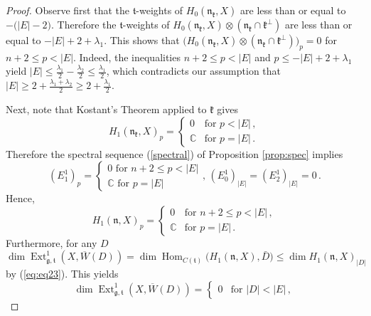 \documentclass{tglat2e}
\theoremstyle{definition}
\theoremstyle{remark}
\renewcommand{\tt}{\mathfrak{t}}
\newcommand{\kk}{\mathfrak{k}}
\newcommand{\nn}{\mathfrak{n}}
\renewcommand{\gg}{\mathfrak{g}}
\DeclareMathOperator{\Hom}{Hom}
\DeclareMathOperator{\Ext}{Ext}
\begin{document}
	\begin{proof}
		Observe first that the $\tt$-weights of $H_0\left(\nn_\kk,X\right)$ are less than or equal to $-\big(|E|-2\big)$.  Therefore the $\tt$-weights of $H_0\left(\nn_\kk,X\right)\otimes \left(\nn_\kk\cap \kk^\perp\right)$ are less than or equal to $-|E|+2+\lambda_1$.  This shows that $\Big(H_0\left(\nn_\kk,X\right)\otimes\left(\nn_\kk\cap\kk^\perp\right)\Big)_p=0$ for $n+2\leq p <|E|$.   Indeed, the inequalities $n+2\leq p<|E|$ and $p\leq -|E|+2+\lambda_1$ yield $|E|\leq \frac{\lambda_1}{2}-\frac{\lambda_2}{2}\leq \frac{\lambda_1}{2}$, which contradicts our assumption that $|E|\geq 2+\frac{\lambda_1+\lambda_2}{2}\geq 2+\frac{\lambda_1}{2}$.
		
		Next, note that Kostant's Theorem applied to $\kk$ gives
		\begin{equation*}
			H_1\left(\nn_\kk,X\right)_p=\left\{
				\begin{array}{ll}
					0	&	\text{for }p<|E|\,,
					\\
					\mathbb{C}	&	\text{for }p=|E|\,.
				\end{array}
			\right.
		\end{equation*}
		Therefore the spectral sequence (\ref{spectral}) of Proposition \ref{prop:spec} implies
\begin{equation*}
(E^1_1)_p=\begin{cases} 0\,\,\text{for}\,\,n+2\leq p<|E|\\ \mathbb C \,\,\text{for}\,\, p=|E|\end{cases}
,\,(E^1_0)_{|E|}=(E^1_2)_{|E|}=0\,.
\end{equation*}
Hence,
		\begin{equation*}
			H_1\left(\nn,X\right)_p=\left\{
				\begin{array}{ll}
					0	&	\text{for }n+2\leq p<|E|\,,
					\\
					\mathbb{C}	&	\text{for }p=|E|\,.
				\end{array}
			\right.
		\end{equation*}
		Furthermore, for any $D$
		\begin{equation*}
			\dim\Ext^1_{\gg,\tt}\left(X,\overline{W}(D)\right)=\dim\Hom_{C(\tt)}\big(H_1(\nn,X),\bar{D}\big) \leq \dim H_1(\nn,X)_{|D|}
		\end{equation*}
		by (\ref{eq:eq23}).  This yields
		\begin{equation*}
			\dim\Ext^1_{\gg,\tt}\left(X,\overline{W}(D)\right)= \left\{
				\begin{array}{ll}
					0	&	\text{for }|D|<|E|\,,

\end{array}
\end{equation*}
\end{proof}
\end{document}
